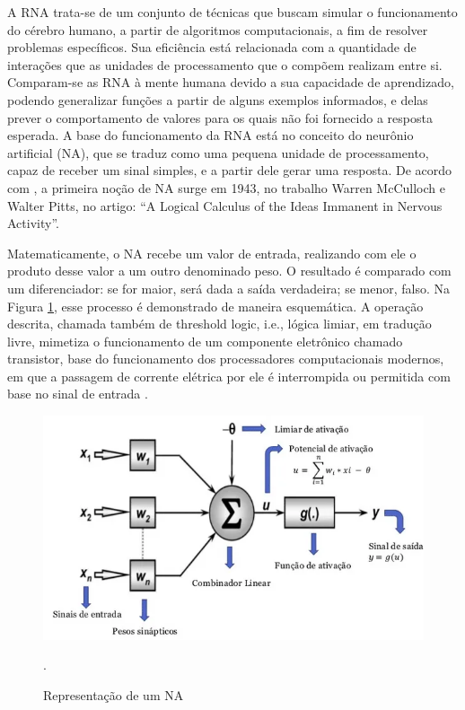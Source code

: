 A RNA trata-se de um conjunto de técnicas que buscam simular o funcionamento do cérebro humano, a partir de algoritmos computacionais, a fim de resolver problemas específicos. Sua eficiência está relacionada com a quantidade de interações que as unidades de processamento que o compõem realizam entre si. Comparam-se as RNA à mente humana devido a sua capacidade de aprendizado, podendo generalizar funções a partir de alguns exemplos informados, e delas prever o comportamento de valores para os quais não foi fornecido a resposta esperada. A base do funcionamento da RNA está no conceito do neurônio artificial (NA), que se traduz como uma pequena unidade de processamento, capaz de receber um sinal simples, e a partir dele gerar uma resposta.  De acordo com  \cite{fleck2016redes}, a primeira noção de NA surge em 1943, no trabalho Warren McCulloch e Walter Pitts, no artigo: “A Logical Calculus of the Ideas Immanent in Nervous Activity”.

Matematicamente, o NA recebe um valor de entrada, realizando com ele o produto desse valor a um outro denominado peso. O resultado é comparado com um diferenciador: se for maior, será dada a saída verdadeira; se menor, falso. Na Figura \ref{fig:na}, esse processo é demonstrado de maneira esquemática. A operação descrita, chamada também de threshold logic, i.e., lógica limiar, em tradução livre, mimetiza o funcionamento de um componente eletrônico chamado transistor, base do funcionamento dos processadores computacionais modernos, em que a passagem de corrente elétrica por ele é interrompida ou permitida com base no sinal de entrada \cite {mcculloch1943logical}. 

\begin{figure}[!h]
    \centering
    \begin{minipage}{0.9\linewidth}
    \centering
    \captionsetup{justification=centering,margin=0.5cm,font=small}
    \includegraphics[width=0.7\linewidth]{img/cap2/na-completo.png}
    \caption{Representação de um NA \cite{adorno2017}}.
    \label{fig:na}
    \end{minipage}
\end{figure}

